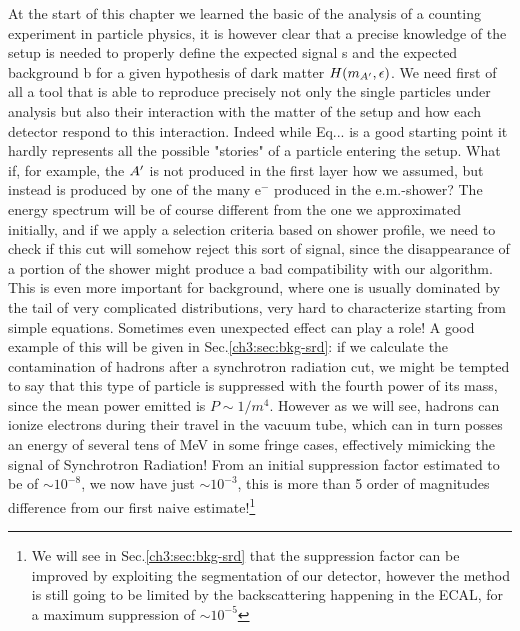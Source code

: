 At the start of this chapter we learned the basic of the analysis of a counting experiment in particle physics, it is however clear that a precise knowledge of the setup is needed to properly define the expected signal s and the expected background b for a given hypothesis of dark matter $H(m_{A'},\epsilon)$. We need first of all a tool that is able to reproduce precisely not only the single particles under analysis but also their interaction with the matter of the setup and how each detector respond to this interaction. Indeed while Eq... is a good starting point it hardly represents all the possible "stories" of a particle entering the setup. What if, for example, the $A'$ is not produced in the first layer how we assumed, but instead is produced by one of the many e$^-$ produced in the e.m.-shower? The energy spectrum will be of course different from the one we approximated initially, and if we apply a selection criteria based on shower profile, we need to check if this cut will somehow reject this sort of signal, since the disappearance of a portion of the shower might produce a bad compatibility with our algorithm. This is even more important for background, where one is usually dominated by the tail of very complicated distributions, very hard to characterize starting from simple equations. Sometimes even unexpected effect can play a role! A good example of this will be given in Sec.\ref{ch3:sec:bkg-srd}: if we calculate the contamination of hadrons after a synchrotron radiation cut, we might be tempted to say that this type of particle is suppressed with the fourth power of its mass, since the mean power emitted is $P \sim 1/m^4$. However as we will see, hadrons can ionize electrons during their travel in the vacuum tube, which can in turn posses an energy of several tens of MeV in some fringe cases, effectively mimicking the signal of Synchrotron Radiation! From an initial suppression factor estimated to be of $\sim 10^{-8}$, we now have just $\sim 10^{-3}$, this is more than 5 order of magnitudes difference from our first naive estimate!\footnote{We will see in Sec.\ref{ch3:sec:bkg-srd} that the suppression factor can be improved by exploiting the segmentation of our detector, however the method is still going to be limited by the backscattering happening in the ECAL, for a maximum suppression of $\sim 10^{-5}$}

